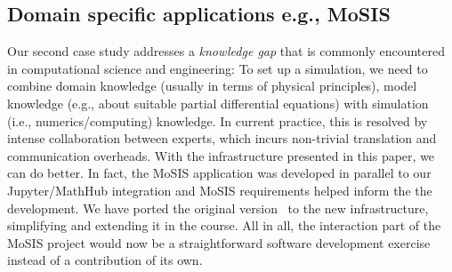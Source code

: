 \subsection{Domain specific applications e.g., MoSIS}
Our second case study addresses a \emph{knowledge gap} that is commonly encountered in computational science and engineering:
To set up a simulation, we need to combine domain knowledge (usually in terms of physical principles), model knowledge (e.g., about suitable partial differential equations) with simulation (i.e., numerics/computing) knowledge.
In current practice, this is resolved by intense collaboration between experts, which incurs non-trivial translation and communication overheads.
With the infrastructure presented in this paper, we can do better.
In fact, the MoSIS application was developed in parallel to our Jupyter/MathHub integration and MoSIS requirements helped inform the the development.
We have ported the original version~\cite{PolKohKoe:kacse18} to the new infrastructure, simplifying and extending it in the course.
All in all, the interaction part of the MoSIS project would now be a straightforward software development exercise instead of a contribution of its own. 

